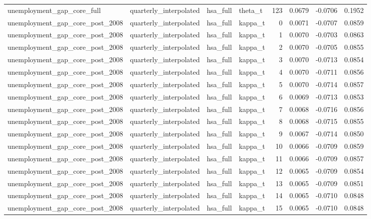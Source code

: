 \begin{tabular}{llllrrrr}
unemployment\_gap\_core\_full & quarterly\_interpolated & hsa\_full & theta\_t & 123 & 0.0679 & -0.0706 & 0.1952 \\
unemployment\_gap\_core\_post\_2008 & quarterly\_interpolated & hsa\_full & kappa\_t & 0 & 0.0071 & -0.0707 & 0.0859 \\
unemployment\_gap\_core\_post\_2008 & quarterly\_interpolated & hsa\_full & kappa\_t & 1 & 0.0070 & -0.0703 & 0.0863 \\
unemployment\_gap\_core\_post\_2008 & quarterly\_interpolated & hsa\_full & kappa\_t & 2 & 0.0070 & -0.0705 & 0.0855 \\
unemployment\_gap\_core\_post\_2008 & quarterly\_interpolated & hsa\_full & kappa\_t & 3 & 0.0070 & -0.0713 & 0.0854 \\
unemployment\_gap\_core\_post\_2008 & quarterly\_interpolated & hsa\_full & kappa\_t & 4 & 0.0070 & -0.0711 & 0.0856 \\
unemployment\_gap\_core\_post\_2008 & quarterly\_interpolated & hsa\_full & kappa\_t & 5 & 0.0070 & -0.0714 & 0.0857 \\
unemployment\_gap\_core\_post\_2008 & quarterly\_interpolated & hsa\_full & kappa\_t & 6 & 0.0069 & -0.0713 & 0.0853 \\
unemployment\_gap\_core\_post\_2008 & quarterly\_interpolated & hsa\_full & kappa\_t & 7 & 0.0068 & -0.0716 & 0.0856 \\
unemployment\_gap\_core\_post\_2008 & quarterly\_interpolated & hsa\_full & kappa\_t & 8 & 0.0068 & -0.0715 & 0.0855 \\
unemployment\_gap\_core\_post\_2008 & quarterly\_interpolated & hsa\_full & kappa\_t & 9 & 0.0067 & -0.0714 & 0.0850 \\
unemployment\_gap\_core\_post\_2008 & quarterly\_interpolated & hsa\_full & kappa\_t & 10 & 0.0066 & -0.0709 & 0.0859 \\
unemployment\_gap\_core\_post\_2008 & quarterly\_interpolated & hsa\_full & kappa\_t & 11 & 0.0066 & -0.0709 & 0.0857 \\
unemployment\_gap\_core\_post\_2008 & quarterly\_interpolated & hsa\_full & kappa\_t & 12 & 0.0065 & -0.0709 & 0.0854 \\
unemployment\_gap\_core\_post\_2008 & quarterly\_interpolated & hsa\_full & kappa\_t & 13 & 0.0065 & -0.0709 & 0.0851 \\
unemployment\_gap\_core\_post\_2008 & quarterly\_interpolated & hsa\_full & kappa\_t & 14 & 0.0065 & -0.0710 & 0.0848 \\
unemployment\_gap\_core\_post\_2008 & quarterly\_interpolated & hsa\_full & kappa\_t & 15 & 0.0065 & -0.0710 & 0.0848 \\

\end{tabular}
